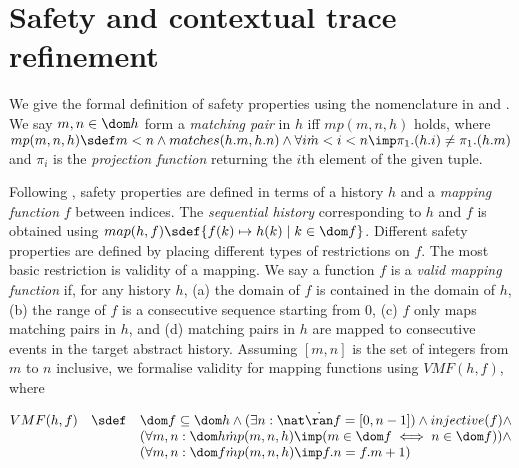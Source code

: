\documentclass[11pt]{llncs}
\def \all  {\forall}
\begin{document}
\section{Safety and contextual trace refinement}




We give the formal definition of safety properties using the
nomenclature in \cite{DDGS15-ECOOP} and \cite{DSW11TOPLAS}. We say
$m, n \in \dom h$ form a \emph{matching pair} in $h$ iff $mp(m,n,h)$
holds, where $ mp(m,n,h) \sdef
  m < n \land matches(h.m, h.n)\land 
  \all i 
  \dot m < i < n\imp  \pi_1.(h.i) \neq \pi_1.(h.m)
$
and $\pi_i$ is the \emph{projection function} returning the $i$th
element of the given tuple.

Following \cite{DDGS15-ECOOP}, safety properties are defined in terms
of a history $h$ and a \emph{mapping function} $f$ between
indices. The \emph{sequential history} corresponding to $h$ and $f$ is
obtained using
$map(h,f) \sdef \{f(k) \mapsto h(k) \mid k \in \dom f\}$.  Different
safety properties are defined by placing different types of
restrictions on $f$. The most basic restriction is validity of a
mapping.  We say a function $f$ is a \emph{valid mapping function} if,
for any history $h$, (a) the domain of $f$ is contained in the domain
of $h$, (b) the range of $f$ is a consecutive sequence starting from
$0$, (c) $f$ only maps matching pairs in $h$, and (d) matching pairs
in $h$ are mapped to consecutive events in the target abstract
history. Assuming $[m,n]$ is the set of integers from $m$ to $n$
inclusive, we formalise validity for mapping functions using
$VMF(h, f)$, where\smallskip

\hfill$  \begin{array}[t]{@{}rcl@{}}
  VMF(h, f) & \sdef & \begin{array}[t]{@{}l@{}}
    \dom f \subseteq \dom h \land  
    (\exists n : \nat \dot \ran f = [0,n-1]) \land injective(f) \land \\
    \begin{array}[t]{@{}l@{}}
      (\all m, n : \dom h \dot
      mp(m,n,h) \imp (m \in \dom f
      \iff n \in \dom f)) \land \\
      (\all m, n : \dom f \dot
      mp(m,n,h)\imp f.n = f.m + 1)
    \end{array}
  \end{array}
  \end{array}$ \hfill{}\smallskip 
\end{document}
